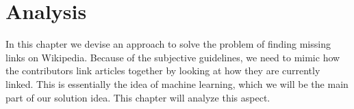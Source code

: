 \chapter{Analysis}\label{chap:analysis}
In this chapter we devise an approach to solve the problem of finding missing links on Wikipedia. 
Because of the subjective guidelines, we need to mimic how the contributors link articles together by looking at how they are currently linked. This is essentially the idea of machine learning, which we will be the main part of our solution idea. This chapter will analyze this aspect.


%




